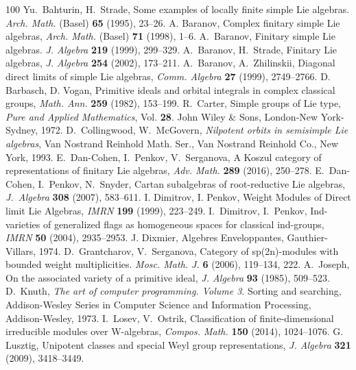 \documentclass{emsprocart}
\begin{document}
\begin{thebibliography}{100}
 Yu.~Bahturin, H.~Strade, Some examples of locally finite simple Lie algebras. {\it Arch. Math.} (Basel) {\bf 65} (1995), 23--26.
 A. Baranov, Complex finitary simple Lie algebras, {\it Arch. Math.} (Basel) {\bf 71} (1998), 1--6.
 A.~Baranov, Finitary simple Lie algebras. {\it J. Algebra} {\bf 219} (1999), 299--329.
 A.~Baranov, H.~Strade, Finitary Lie algebras, {\it J. Algebra} {\bf 254} (2002), 173--211.
 A.~Baranov, A.~Zhilinskii, Diagonal direct limits of simple Lie algebras, {\it Comm. Algebra} {\bf 27} (1999), 2749--2766.
  D. Barbasch, D. Vogan, Primitive ideals and orbital integrals in complex classical groups, {\it Math. Ann.} {\bf 259} (1982), 153--199.
 R.~Carter, Simple groups of Lie type, {\it Pure and Applied Mathematics}, Vol. {\bf 28}. John Wiley \& Sons, London-New York-Sydney, 1972.
 D.~Collingwood, W.~McGovern, {\it Nilpotent orbits in semisimple Lie algebras}, Van Nostrand Reinhold Math. Ser., Van Nostrand Reinhold Co., New York, 1993.
 E.~Dan-Cohen, I.~Penkov, V.~Serganova, A Koszul category of representations of finitary Lie algebras, {\it Adv. Math.} {\bf 289} (2016), 250--278.
E.~Dan-Cohen, I.~Penkov,  N.~Snyder, Cartan subalgebras of root-reductive Lie algebras, {\it J.~Algebra} {\bf 308} (2007), 583--611.
 I. Dimitrov, I. Penkov, Weight Modules of Direct limit Lie Algebras, {\it IMRN} {\bf 199} (1999), 223--249.
  I.~Dimitrov, I.~Penkov, Ind-varieties of generalized flags as homogeneous spaces for classical ind-groups, {\it IMRN} {\bf 50} (2004), 2935--2953.
 J. Dixmier, Algebres Enveloppantes, Gauthier-Villars, 1974.
  D.~Grantcharov, V.~Serganova, Category of sp(2n)-modules with bounded weight multiplicities. {\it Mosc. Math. J.} {\bf 6} (2006), 119--134, 222.
 A.~Joseph, On the associated variety of a primitive ideal, {\it J. Algebra} {\bf 93} (1985), 509--523.
 D.~Knuth, {\it The art of computer programming. Volume 3}. Sorting and searching, Addison-Wesley Series in Computer Science and Information Processing,  Addison-Wesley, 1973.
 I.~Losev, V.~Ostrik, Classification of finite-dimensional irreducible modules over W-algebras, {\it Compos. Math.} {\bf 150} (2014), 1024--1076.
 G. Lusztig, Unipotent classes and special Weyl group representations, {\it J. Algebra} {\bf 321} (2009), 3418--3449.

\end{thebibliography}
\end{document}
